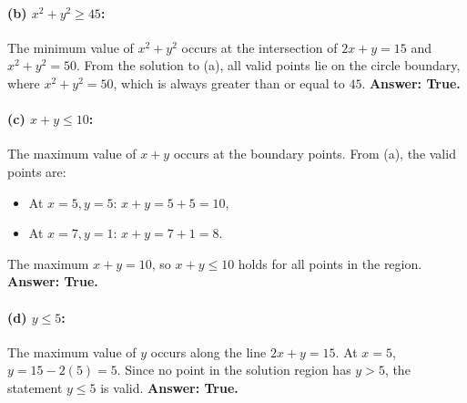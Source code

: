 \documentclass[12pt]{article}
\begin{document}
\paragraph{(b) \(x^2 + y^2 \geq 45\):}

The minimum value of \(x^2 + y^2\) occurs at the intersection of \(2x + y = 15\) and \(x^2 + y^2 = 50\). From the solution to (a), all valid points lie on the circle boundary, where \(x^2 + y^2 = 50\), which is always greater than or equal to \(45\). \textbf{Answer: True.}

\paragraph{(c) \(x + y \leq 10\):}

The maximum value of \(x + y\) occurs at the boundary points. From (a), the valid points are:
\begin{itemize}
    \item At \(x = 5, y = 5\): \(x + y = 5 + 5 = 10\),
    \item At \(x = 7, y = 1\): \(x + y = 7 + 1 = 8\).
\end{itemize}
The maximum \(x + y = 10\), so \(x + y \leq 10\) holds for all points in the region. \textbf{Answer: True.}

\paragraph{(d) \(y \leq 5\):}

The maximum value of \(y\) occurs along the line \(2x + y = 15\). At \(x = 5\), \(y = 15 - 2(5) = 5\). Since no point in the solution region has \(y > 5\), the statement \(y \leq 5\) is valid. \textbf{Answer: True.}
\end{document}

